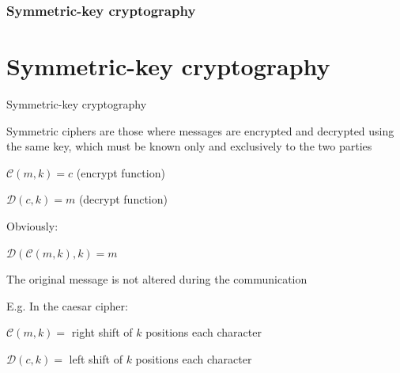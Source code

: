\section[Section]{Symmetric-key cryptography}
\part{Symmetric-key cryptography}

\begin{frame}{Symmetric-key cryptography}

  Symmetric ciphers are those where messages are encrypted and decrypted using the same key, which must be known only and exclusively to the two parties
  
  \medskip

  \phantom{padding}$\mathcal{C}(m, k) = c$ (encrypt function)
    
  \phantom{padding}$\mathcal{D}(c, k) = m$ (decrypt function)
  
  \medskip

  Obviously:
  
  \phantom{padding}$\mathcal{D}(\mathcal{C}(m, k), k) = m$ 
  
  \phantom{padding}The original message is not altered during the communication
  
  \medskip
  
  E.g. In the caesar cipher:
  
  \phantom{padding}$\mathcal{C}(m, k) = $ right shift of $k$ positions each character
  
  \phantom{padding}$\mathcal{D}(c, k) = $ left shift of $k$ positions each character

\end{frame}

